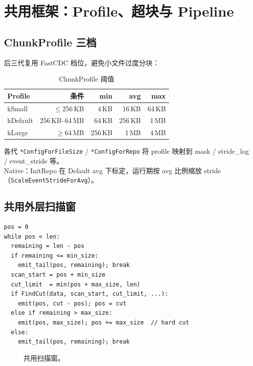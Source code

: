 \chapter{共用框架：Profile、超块与 Pipeline}
\label{ch:shared}

\section{ChunkProfile 三档}

后三代复用 FastCDC 档位，避免小文件过度分块：

\begin{table}[htbp]
\centering
\caption{ChunkProfile 阈值}
\label{tab:profile-shared}
\begin{tabular}{@{}lrrrr@{}}
\toprule
Profile & 条件 & min & avg & max \\
\midrule
kSmall & $\le$256\,KB & 4\,KB & 16\,KB & 64\,KB \\
kDefault & 256\,KB--64\,MB & 64\,KB & 256\,KB & 1\,MB \\
kLarge & $\ge$64\,MB & 256\,KB & 1\,MB & 4\,MB \\
\bottomrule
\end{tabular}
\end{table}

各代 \texttt{*ConfigForFileSize} / \texttt{*ConfigForRepo} 将 profile 映射到 mask / stride\_log / event\_stride 等。\\
Native：InitRepo 在 Default avg 下标定，运行期按 avg 比例缩放 stride（\texttt{ScaleEventStrideForAvg}）。

\section{共用外层扫描窗}

\begin{lstlisting}[caption={共用 cut 窗外层伪码},label={lst:shared-window}]
pos = 0
while pos < len:
  remaining = len - pos
  if remaining <= min_size:
    emit_tail(pos, remaining); break
  scan_start = pos + min_size
  cut_limit  = min(pos + max_size, len)
  if FindCut(data, scan_start, cut_limit, ...):
    emit(pos, cut - pos); pos = cut
  else if remaining > max_size:
    emit(pos, max_size); pos += max_size  // hard cut
  else:
    emit_tail(pos, remaining); break
\end{lstlisting}

\begin{figure}[htbp]
\centering
{}
\caption{共用扫描窗。}
\label{fig:shared-scan-window}
\end{figure}

